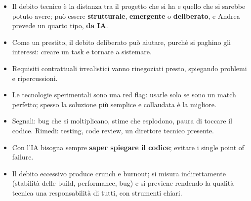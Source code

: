 \begin{itemize}
  \item Il debito tecnico è la distanza tra il progetto che si ha e quello che si
        sarebbe potuto avere; può essere \textbf{strutturale}, \textbf{emergente}
        o \textbf{deliberato}, e Andrea prevede un quarto tipo, \textbf{da IA}.
  \item Come un prestito, il debito deliberato può aiutare, purché si paghino gli
        interessi: creare un task e tornare a sistemare.
  \item Requisiti contrattuali irrealistici vanno rinegoziati presto, spiegando
        problemi e ripercussioni.
  \item Le tecnologie sperimentali sono una red flag: usarle solo se sono un match
        perfetto; spesso la soluzione più semplice e collaudata è la migliore.
  \item Segnali: bug che si moltiplicano, stime che esplodono, paura di toccare il
        codice. Rimedi: testing, code review, un direttore tecnico presente.
  \item Con l'IA bisogna sempre \textbf{saper spiegare il codice}; evitare i
        single point of failure.
  \item Il debito eccessivo produce crunch e burnout; si misura indirettamente
        (stabilità delle build, performance, bug) e si previene rendendo la
        qualità tecnica una responsabilità di tutti, con strumenti chiari.
\end{itemize}
